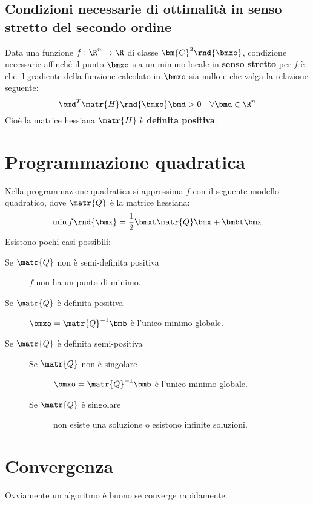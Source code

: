 \documentclass[\main/main.tex]{subfiles}
\begin{document}
\section{Condizioni necessarie di ottimalità in senso stretto del secondo ordine}
\begin{theorem}
    Data una funzione \(f: \R^n \rightarrow \R \) di classe \(\bm{C}^2\rnd{\bmxo}\), condizione necessarie affinché il punto \(\bmxo \) sia un minimo locale in \textbf{senso stretto} per \(f\) è che il gradiente della funzione calcolato in \(\bmxo \) sia nullo e che valga la relazione seguente:
    \[
        \bmd^T \matr{H} \rnd{\bmxo}\bmd > 0 \quad \forall \bmd \in \R^n
    \]    Cioè la matrice hessiana \(\matr{H}\) è \textbf{definita positiva}.
\end{theorem}

\chapter{Programmazione quadratica}
Nella programmazione quadratica si approssima \(f\) con il seguente modello quadratico, dove \(\matr{Q} \) è la matrice hessiana:
\[
    \min f\rnd{\bmx} = \frac{1}{2}\bmxt \matr{Q}\bmx + \bmbt \bmx
\]Esistono pochi casi possibili:

\begin{description}
    \item[Se \(\matr{Q}\) non è semi-definita positiva] \(f\) non ha un punto di minimo.
    \item[Se \(\matr{Q}\) è definita positiva] \(\bmxo = \matr{Q}^{-1}\bmb \) è l'unico minimo globale.
    \item[Se \(\matr{Q}\) è definita semi-positiva]
          \begin{description}
              \item[Se \(\matr{Q}\) non è singolare]  \(\bmxo = \matr{Q}^{-1}\bmb \) è l'unico minimo globale.
              \item[Se \(\matr{Q}\) è singolare] non esiste una soluzione o esistono infinite soluzioni.
          \end{description}
\end{description}

\chapter{Convergenza}
Ovviamente un algoritmo è buono se converge rapidamente.
\end{document}
